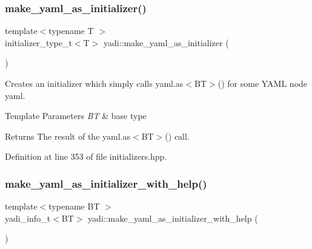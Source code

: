 \mbox{\label{namespaceyadi_afb3e57191502ac483355c06b47fa228a}} 
\subsubsection{\texorpdfstring{make\+\_\+yaml\+\_\+as\+\_\+initializer()}{make\_yaml\_as\_initializer()}\hspace{0.1cm}{\footnotesize\ttfamily [2/2]}}
{\footnotesize\ttfamily template$<$typename T $>$ \\
initializer\+\_\+type\+\_\+t$<$T$>$ yadi\+::make\+\_\+yaml\+\_\+as\+\_\+initializer (\begin{DoxyParamCaption}{ }\end{DoxyParamCaption})}



Creates an initializer which simply calls yaml.\+as$<$\+B\+T$>$() for some Y\+A\+ML node yaml. 


\begin{DoxyTemplParams}{Template Parameters}
{\em BT} & base type \\
\hline
\end{DoxyTemplParams}
\begin{DoxyReturn}{Returns}
The result of the yaml.\+as$<$\+B\+T$>$() call. 
\end{DoxyReturn}


Definition at line 353 of file initializers.\+hpp.

\mbox{\label{namespaceyadi_a7bd6415252b551f9ffae445d25e30b7a}} 
\subsubsection{\texorpdfstring{make\+\_\+yaml\+\_\+as\+\_\+initializer\+\_\+with\+\_\+help()}{make\_yaml\_as\_initializer\_with\_help()}\hspace{0.1cm}{\footnotesize\ttfamily [1/2]}}
{\footnotesize\ttfamily template$<$typename BT $>$ \\
yadi\+\_\+info\+\_\+t$<$BT$>$ yadi\+::make\+\_\+yaml\+\_\+as\+\_\+initializer\+\_\+with\+\_\+help (\begin{DoxyParamCaption}{ }\end{DoxyParamCaption})}



